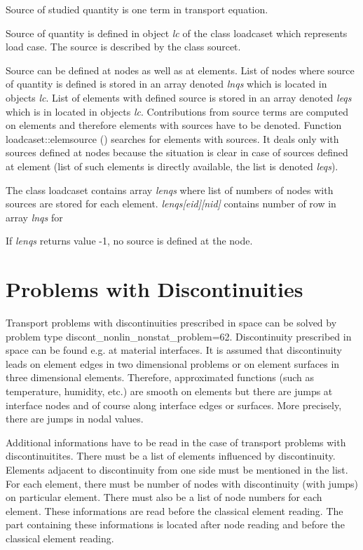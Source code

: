 Source of studied quantity is one term in transport equation.

Source of quantity is defined in object {\it lc} of the class {\sf loadcaset}
which represents load case. The source is described by the class {\sf sourcet}.

Source can be defined at nodes as well as at elements. List of nodes where source
of quantity is defined is stored in an array denoted {\it lnqs} which is located in
objects {\it lc}. List of elements with defined source is stored in an array denoted
{\it leqs} which is in located in objects {\it lc}. Contributions from source terms
are computed on elements and therefore elements with sources have to be denoted.
Function {\sf loadcaset::elemsource ()} searches for elements with sources.
It deals only with sources defined at nodes because the situation is clear in case of
sources defined at element (list of such elements is directly available, the list
is denoted {\it leqs}). 

 The class {\sf loadcaset} contains array {\it lenqs} where
list of numbers of nodes with sources are stored for each element. {\it lenqs[eid][nid]}
contains number of row in array {\it lnqs} for


If {\it lenqs} returns value -1, no source is defined at the node.

\section{Problems with Discontinuities}

Transport problems with discontinuities prescribed in space can be solved
by problem type discont\_nonlin\_nonstat\_problem=62. Discontinuity prescribed
in space can be found e.g. at material interfaces. It is assumed that
discontinuity leads on element edges in two dimensional problems or on
element surfaces in three dimensional elements. Therefore, approximated
functions (such as temperature, humidity, etc.) are smooth on elements
but there are jumps at interface nodes and of course along interface edges or surfaces.
More precisely, there are jumps in nodal values.

Additional informations have to be read in the case of transport problems
with discontinuitites. There must be a list of elements influenced by
discontinuity. Elements adjacent to discontinuity from one side must
be mentioned in the list. For each element, there must be number of
nodes with discontinuity (with jumps) on particular element. There must
also be a list of node numbers for each element. These informations
are read before the classical element reading. The part
containing these informations is located after node reading
and before the classical element reading.

